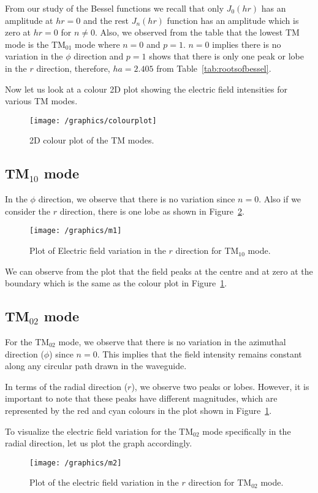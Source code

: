 From our study of the Bessel functions we recall that only $J_0(hr)$ has an amplitude at $hr = 0$ and the rest $J_n(hr)$ function has an amplitude which is zero at $hr = 0$ for $n \ne 0$. Also, we observed from the table that the lowest TM mode is the TM$_{01}$ mode where $n = 0$ and $p = 1$. $n = 0$ implies there is no variation in the $\phi$ direction and $p = 1$ shows that there is only one peak or lobe in the $r$ direction, therefore, $ha = 2.405$ from Table~\ref{tab:rootsofbessel}. 

Now let us look at a colour 2D plot showing the electric field intensities for various TM modes.
\begin{figure}[h]
\centering
\texttt{[image: /graphics/colourplot]}
\caption{2D colour plot of the TM modes.}
\label{fig:colourplot}
\end{figure}

\subsection{TM$_{10}$ mode}
In the $\phi$ direction, we observe that there is no variation since $n=0$. Also if we consider the $r$ direction, there is one lobe as shown in Figure~\ref{fig:m1}.
\begin{figure}[h]
\centering
\texttt{[image: /graphics/m1]}
\caption{Plot of Electric field variation in the $r$ direction for TM$_{10}$ mode.}
\label{fig:m1}
\end{figure}

We can observe from the plot that the field peaks at the centre and at zero at the boundary which is the same as the colour plot in Figure~\ref{fig:colourplot}.
   
\subsection{TM$_{02}$ mode}
For the TM$_{02}$ mode, we observe that there is no variation in the azimuthal direction ($\phi$) since $n=0$. This implies that the field intensity remains constant along any circular path drawn in the waveguide.

In terms of the radial direction ($r$), we observe two peaks or lobes. However, it is important to note that these peaks have different magnitudes, which are represented by the red and cyan colours in the plot shown in Figure~\ref{fig:colourplot}. 

To visualize the electric field variation for the TM$_{02}$ mode specifically in the radial direction, let us plot the graph accordingly.
\begin{figure}[h]
\centering
\texttt{[image: /graphics/m2]}
\caption{Plot of the electric field variation in the $r$ direction for TM$_{02}$ mode.}
\label{fig:m2}
\end{figure}

